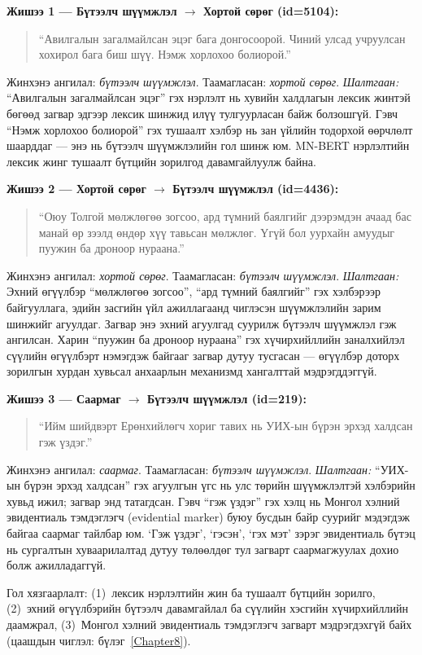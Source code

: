 \textbf{Жишээ 1 — Бүтээлч шүүмжлэл $\to$ Хортой сөрөг (id=5104):}
\begin{quote}
``Авилгалын загалмайлсан эцэг бага донгосоорой. Чиний улсад учруулсан
хохирол бага биш шүү. Нэмж хорлохоо болиорой.''
\end{quote}
Жинхэнэ ангилал: \textit{бүтээлч шүүмжлэл}. Таамагласан: \textit{хортой сөрөг}.
\emph{Шалтгаан:} ``Авилгалын загалмайлсан эцэг'' гэх нэрлэлт нь хувийн
халдлагын лексик жинтэй бөгөөд загвар эдгээр лексик шинжид илүү тулгуурласан
байж болзошгүй.
Гэвч ``Нэмж хорлохоо болиорой'' гэх тушаалт хэлбэр нь зан үйлийн тодорхой
өөрчлөлт шаарддаг --- энэ нь бүтээлч шүүмжлэлийн гол шинж юм.
MN-BERT нэрлэлтийн лексик жинг тушаалт бүтцийн зорилгод давамгайлуулж байна.

\textbf{Жишээ 2 — Хортой сөрөг $\to$ Бүтээлч шүүмжлэл (id=4436):}
\begin{quote}
``Оюу Толгой мөлжлөгөө зогсоо, ард түмний баялгийг дээрэмдэн ачаад бас
манай өр зээлд өндөр хүү тавьсан мөлжлөг. Үгүй бол уурхайн амуудыг
пуужин ба дроноор нураана.''
\end{quote}
Жинхэнэ ангилал: \textit{хортой сөрөг}. Таамагласан: \textit{бүтээлч шүүмжлэл}.
\emph{Шалтгаан:} Эхний өгүүлбэр ``мөлжлөгөө зогсоо'', ``ард түмний баялгийг''
гэх хэлбэрээр байгууллага, эдийн засгийн үйл ажиллагаанд чиглэсэн шүүмжлэлийн
зарим шинжийг агуулдаг.
Загвар энэ эхний агуулгад суурилж бүтээлч шүүмжлэл гэж ангилсан.
Харин ``пуужин ба дроноор нураана'' гэх хүчирхийллийн заналхийлэл сүүлийн
өгүүлбэрт нэмэгдэж байгааг загвар дутуу тусгасан --- өгүүлбэр доторх
зорилгын хурдан хувьсал анхаарлын механизмд хангалттай мэдрэгддэггүй.

\textbf{Жишээ 3 — Саармаг $\to$ Бүтээлч шүүмжлэл (id=219):}
\begin{quote}
``Ийм шийдвэрт Ерөнхийлөгч хориг тавих нь УИХ-ын бүрэн эрхэд
халдсан гэж үздэг.''
\end{quote}
Жинхэнэ ангилал: \textit{саармаг}. Таамагласан: \textit{бүтээлч шүүмжлэл}.
\emph{Шалтгаан:} ``УИХ-ын бүрэн эрхэд халдсан'' гэх агуулгын үгс нь улс
төрийн шүүмжлэлтэй хэлбэрийн хувьд ижил; загвар энд татагдсан.
Гэвч ``гэж үздэг'' гэх хэлц нь Монгол хэлний эвидентиаль тэмдэглэгч
(evidential marker) буюу бусдын байр суурийг мэдэгдэж байгаа саармаг
тайлбар юм. `Гэж үздэг', `гэсэн', `гэх мэт' зэрэг эвидентиаль бүтэц нь
сургалтын хуваарилалтад дутуу төлөөлдөг тул загварт саармагжуулах
дохио болж ажилладаггүй.

Гол хязгаарлалт: (1)~лексик нэрлэлтийн жин ба тушаалт бүтцийн зорилго,
(2)~эхний өгүүлбэрийн бүтээлч давамгайлал ба сүүлийн хэсгийн хүчирхийллийн
даамжрал, (3)~Монгол хэлний эвидентиаль тэмдэглэгч загварт мэдрэгдэхгүй байх
(цаашдын чиглэл: бүлэг~\ref{Chapter8}).

